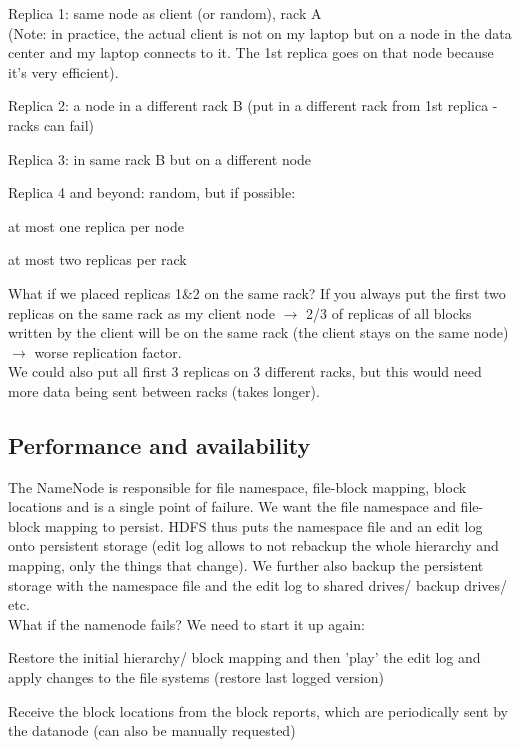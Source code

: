 \documentclass[11pt,oneside,a4paper]{article}
\begin{document}
\begin{compactitem}
	\item Replica 1: same node as client (or random), rack A\\
	(Note: in practice, the actual client is not on my laptop but on a node in the data center and my laptop connects to it. The 1st replica goes on that node because it's very efficient).
	\item Replica 2: a node in a different rack B (put in a different rack from 1st replica - racks can fail)
	\item Replica 3: in same rack B but on a different node
	\item Replica 4 and beyond: random, but if possible:
	\begin{compactitem}
		\item at most one replica per node
		\item at most two replicas per rack\\
	\end{compactitem}
\end{compactitem}

What if we placed replicas 1\&2 on the same rack? If you always put the first two replicas on the same rack as my client node $\rightarrow$ 2/3 of replicas of all blocks written by the client will be on the same rack (the client stays on the same node) $\rightarrow$ worse replication factor.\\

We could also put all first 3 replicas on 3 different racks, but this would need more data being sent between racks (takes longer).

\subsection{Performance and availability}

The NameNode is responsible for file namespace, file-block mapping, block locations and is a single point of failure. We want the file namespace and file-block mapping to persist. HDFS thus puts the namespace file and an edit log onto persistent storage (edit log allows to not rebackup the whole hierarchy and mapping, only the things that change). We further also backup the persistent storage with the namespace file and the edit log to shared drives/ backup drives/ etc.\\

What if the namenode fails? We need to start it up again:

\begin{compactitem}
	\item Restore the initial hierarchy/ block mapping and then 'play' the edit log and apply changes to the file systems (restore last logged version)
	\item Receive the block locations from the block reports, which are periodically sent by the datanode (can also be manually requested)
\end{compactitem}
\end{document}

